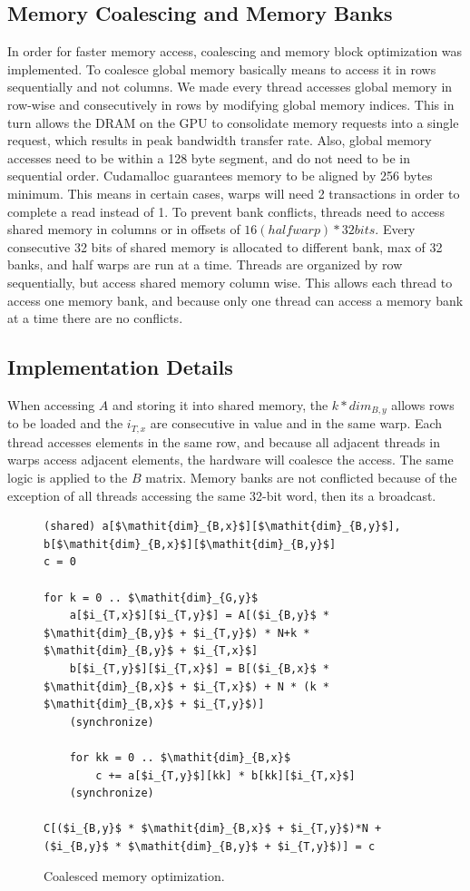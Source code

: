 \documentclass[12pt]{article}
\begin{document}
\subsection{Memory Coalescing and Memory Banks}
In order for faster memory access, coalescing and memory block optimization was implemented. To coalesce global memory basically means to access it in rows sequentially and not columns. We made every thread accesses global memory in row-wise and consecutively in rows by modifying global memory indices. This in turn allows the DRAM on the GPU to consolidate memory requests into a single request, which results in peak bandwidth transfer rate. Also, global memory accesses need to be within a 128 byte segment, and do not need to be in sequential order. Cudamalloc guarantees memory to be aligned by 256 bytes minimum. This means in certain cases, warps will need 2 transactions in order to complete a read instead of 1. To prevent bank conflicts, threads need to access shared memory in columns or in offsets of $16(half warp)*32bits$. Every consecutive 32 bits of shared memory is allocated to different bank, max of 32 banks, and half warps are run at a time. Threads are organized by row sequentially, but access shared memory column wise. This allows each thread to access one memory bank, and because only one thread can access a memory bank at a time there are no conflicts.
\subsection{Implementation Details}
When accessing $A$ and storing it into shared memory, the $k * \mathit{dim}_{B,y}$ allows rows to be loaded and the $i_{T,x}$ are consecutive in value and in the same warp. Each thread accesses elements in the same row, and because all adjacent threads in warps access adjacent elements, the hardware will coalesce the access. The same logic is applied to the $B$ matrix. Memory banks are not conflicted because of the exception of all threads accessing the same 32-bit word, then its a broadcast.

\begin{figure}[H]
\begin{lstlisting}[mathescape]
(shared) a[$\mathit{dim}_{B,x}$][$\mathit{dim}_{B,y}$], b[$\mathit{dim}_{B,x}$][$\mathit{dim}_{B,y}$]
c = 0

for k = 0 .. $\mathit{dim}_{G,y}$
	a[$i_{T,x}$][$i_{T,y}$] = A[($i_{B,y}$ * $\mathit{dim}_{B,y}$ + $i_{T,y}$) * N+k * $\mathit{dim}_{B,y}$ + $i_{T,x}$]
	b[$i_{T,y}$][$i_{T,x}$] = B[($i_{B,x}$ * $\mathit{dim}_{B,x}$ + $i_{T,x}$) + N * (k * $\mathit{dim}_{B,x}$ + $i_{T,y}$)]
    (synchronize)
    
	for kk = 0 .. $\mathit{dim}_{B,x}$
		c += a[$i_{T,y}$][kk] * b[kk][$i_{T,x}$]
    (synchronize)
    
C[($i_{B,y}$ * $\mathit{dim}_{B,x}$ + $i_{T,y}$)*N + ($i_{B,y}$ * $\mathit{dim}_{B,y}$ + $i_{T,y}$)] = c
\end{lstlisting}
\caption{Coalesced memory optimization.}
\label{fig:coa_mem}
\end{figure}
\end{document}
